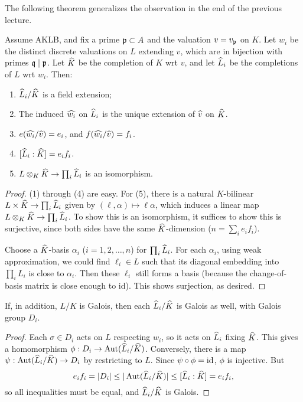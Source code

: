 \documentclass[11pt]{amsart}
\begin{document}
The following theorem generalizes the observation in the end of the previous lecture.

\begin{thm}
Assume AKLB, and fix a prime $\mathfrak{p}\subset A$ and the valuation $v = v_{\mathfrak{p}}$ on $K$. Let $w_i$ be the distinct discrete valuations on $L$ extending $v$, which are in bijection with primes $\mathfrak{q}\mid\mathfrak{p}$. Let $\widehat{K}$ be the completion of $K$ wrt $v$, and let $\widehat{L}_i$ be the completions of $L$ wrt $w_i$. Then:
\begin{enumerate}
    \item $\widehat{L}_i/\widehat{K}$ is a field extension;
    \item The induced $\widehat{w_i}$ on $\widehat{L}_i$ is the unique extension of $\widehat{v}$ on $\widehat{K}$.
    \item $e(\widehat{w_i}/\widehat{v}) = e_i$, and $f(\widehat{w_i}/\widehat{v}) = f_i$.
    \item $[\widehat{L}_i:\widehat{K}] = e_if_i$.
    \item $L\otimes_K \widehat{K} \to \prod_i \widehat{L}_i$ is an isomorphism.
\end{enumerate}
\end{thm}

\begin{proof}
(1) through (4) are easy. For (5), there is a natural $K$-bilinear $L\times \widehat{K} \to \prod_i\widehat{L}_i$ given by $(\ell, \alpha) \mapsto \ell\alpha$, which induces a linear map $L\otimes_K \widehat{K} \to \prod_i \widehat{L}_i$. To show this is an isomorphism, it suffices to show this is surjective, since both sides have the same $\widehat{K}$-dimension ($n = \sum_i e_if_i$). 

Choose a $\widehat{K}$-basis $\alpha_i$ ($i=1,2,\dots,n$) for $\prod_i \widehat{L}_i$. For each $\alpha_i$, using weak approximation, we could find $\ell_i\in L$ such that its diagonal embedding into $\prod_i L_i$ is close to $\alpha_i$. Then these $\ell_i$ still forms a basis (because the change-of-basis matrix is close enough to id). This shows surjection, as desired.
\end{proof}

\begin{prop}
If, in addition, $L/K$ is Galois, then each $\widehat{L}_i/\widehat{K}$ is Galois as well, with Galois group $D_i$.
\end{prop}

\begin{proof}
Each $\sigma\in D_i$ acts on $L$ respecting $w_i$, so it acts on $\widehat{L}_i$ fixing $\widehat{K}$. This gives a homomorphism $\phi: D_i\to \operatorname{Aut}(\widehat{L}_i/\widehat{K})$. Conversely, there is a map $\psi: \operatorname{Aut}(\widehat{L}_i/\widehat{K}) \to D_i$ by restricting to $L$. Since $\psi\circ\phi = \operatorname{id}$, $\phi$ is injective. But
\[e_if_i = |D_i| \le |\operatorname{Aut}(\widehat{L}_i/\widehat{K})| \le [\widehat{L}_i:\widehat{K}] = e_if_i,\]
so all inequalities must be equal, and $\widehat{L}_i/\widehat{K}$ is Galois.
\end{proof}
\end{document}
